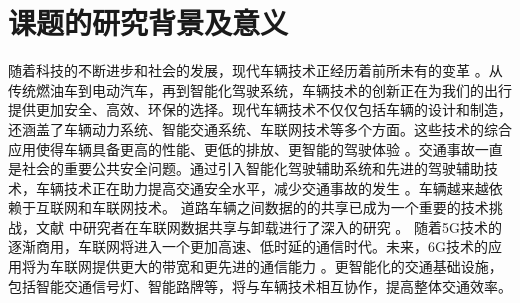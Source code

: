 \section{课题的研究背景及意义}\label{section1-1}

随着科技的不断进步和社会的发展，现代车辆技术正经历着前所未有的变革 \supercite{SystematicSurvey10225497,DeepReinforcement9146378}。从传统燃油车到电动汽车，再到智能化驾驶系统，车辆技术的创新正在为我们的出行提供更加安全、高效、环保的选择。现代车辆技术不仅仅包括车辆的设计和制造，还涵盖了车辆动力系统、智能交通系统、车联网技术等多个方面。这些技术的综合应用使得车辆具备更高的性能、更低的排放、更智能的驾驶体验 \supercite{Autonomous9351818}。交通事故一直是社会的重要公共安全问题。通过引入智能化驾驶辅助系统和先进的驾驶辅助技术，车辆技术正在助力提高交通安全水平，减少交通事故的发生 \supercite{SecurityandPrivacy}。车辆越来越依赖于互联网和车联网技术。
道路车辆之间数据的的共享已成为一个重要的技术挑战，文献 \cite{刘雪娇186}中研究者在车联网数据共享与卸载进行了深入的研究 。
随着5G技术的逐渐商用，车联网将进入一个更加高速、低时延的通信时代。未来，6G技术的应用将为车联网提供更大的带宽和更先进的通信能力 \supercite{6GforVehicle}。更智能化的交通基础设施，包括智能交通信号灯、智能路牌等，将与车辆技术相互协作，提高整体交通效率。

